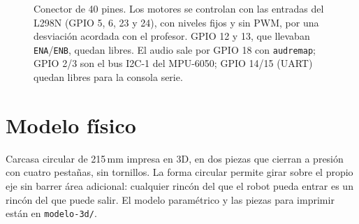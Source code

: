 \documentclass[11pt,a4paper]{article}
\begin{document}
\begin{figure}[h]
\caption{Conector de 40 pines. Los motores se controlan con las entradas
del L298N (GPIO 5, 6, 23 y 24), con niveles fijos y sin PWM, por una
desviación acordada con el profesor. GPIO 12 y 13, que
llevaban \texttt{ENA}/\texttt{ENB}, quedan libres. El audio sale por GPIO 18 con \texttt{audremap}; GPIO 2/3 son el bus
I2C-1 del MPU-6050; GPIO 14/15 (UART) quedan libres para la consola serie.}
\end{figure}

\clearpage
\section{Modelo físico}

Carcasa circular de 215\,mm impresa en 3D, en dos piezas que cierran a
presión con cuatro pestañas, sin tornillos. La forma circular permite girar
sobre el propio eje sin barrer área adicional: cualquier rincón del que el
robot pueda entrar es un rincón del que puede salir. El modelo paramétrico y
las piezas para imprimir están en \texttt{modelo-3d/}.
\end{document}
